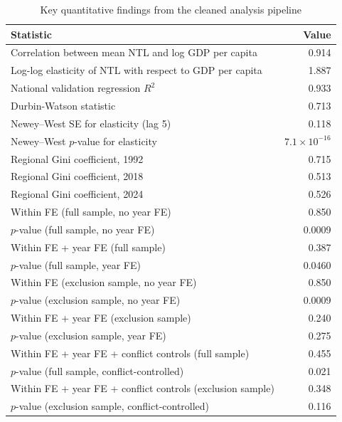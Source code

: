 \begin{table}[ht]
\centering
\caption{Key quantitative findings from the cleaned analysis pipeline}
\begin{tabular}{p{}r}
\toprule
Statistic & Value \\
\midrule
Correlation between mean NTL and log GDP per capita & 0.914 \\
Log-log elasticity of NTL with respect to GDP per capita & 1.887 \\
National validation regression $R^2$ & 0.933 \\
Durbin-Watson statistic & 0.713 \\
Newey--West SE for elasticity (lag 5) & 0.118 \\
Newey--West $p$-value for elasticity & $7.1\times 10^{-16}$ \\
Regional Gini coefficient, 1992 & 0.715 \\
Regional Gini coefficient, 2018 & 0.513 \\
Regional Gini coefficient, 2024 & 0.526 \\
Within FE (full sample, no year FE) & 0.850 \\
$p$-value (full sample, no year FE) & 0.0009 \\
Within FE + year FE (full sample) & 0.387 \\
$p$-value (full sample, year FE) & 0.0460 \\
Within FE (exclusion sample\footnotemark[1], no year FE) & 0.850 \\
$p$-value (exclusion sample, no year FE) & 0.0009 \\
Within FE + year FE (exclusion sample\footnotemark[1]) & 0.240 \\
$p$-value (exclusion sample, year FE) & 0.275 \\
Within FE + year FE + conflict controls (full sample) & 0.455 \\
$p$-value (full sample, conflict-controlled) & 0.021 \\
Within FE + year FE + conflict controls (exclusion sample\footnotemark[1]) & 0.348 \\
$p$-value (exclusion sample, conflict-controlled) & 0.116 \\
\bottomrule
\end{tabular}
\label{tab:keyresults}
\end{table}
